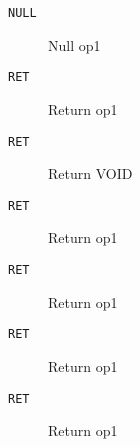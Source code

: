 \begin{description}
\item[\texttt{NULL}]  Null op1\\

\end{description}
\begin{description}
\item[\texttt{RET}]  Return op1\\

\end{description}
\begin{description}
\item[\texttt{RET}]  Return VOID\\

\end{description}
\begin{description}
\item[\texttt{RET}]  Return op1\\

\end{description}
\begin{description}
\item[\texttt{RET}]  Return op1\\

\end{description}
\begin{description}
\item[\texttt{RET}]  Return op1\\

\end{description}
\begin{description}
\item[\texttt{RET}]  Return op1\\

\end{description}
